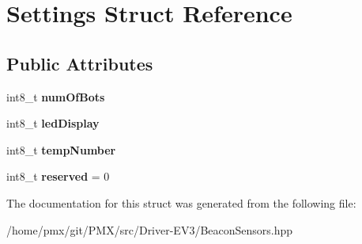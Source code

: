 \hypertarget{structSettings}{}\section{Settings Struct Reference}
\label{structSettings}
\subsection*{Public Attributes}
\begin{DoxyCompactItemize}
\item 
\mbox{\label{structSettings_a3c0674b0c7989543e8da3e287611db8a}} 
int8\+\_\+t {\bfseries num\+Of\+Bots}
\item 
\mbox{\label{structSettings_ab9b9b796064ba36cf4f3292b5625934f}} 
int8\+\_\+t {\bfseries led\+Display}
\item 
\mbox{\label{structSettings_aad56c7d634e50b686c7176f34d3ed8df}} 
int8\+\_\+t {\bfseries temp\+Number}
\item 
\mbox{\label{structSettings_a13e9fa40617442e536fb0b736fcc8c19}} 
int8\+\_\+t {\bfseries reserved} = 0
\end{DoxyCompactItemize}


The documentation for this struct was generated from the following file\+:\begin{DoxyCompactItemize}
\item 
/home/pmx/git/\+P\+M\+X/src/\+Driver-\/\+E\+V3/Beacon\+Sensors.\+hpp\end{DoxyCompactItemize}
